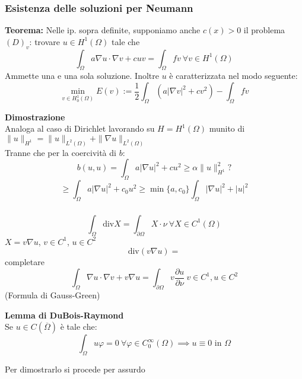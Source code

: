 \subsubsection{Esistenza delle soluzioni per Neumann}
\begin{tcolorbox}
	\textbf{Teorema: }Nelle ip. sopra definite, supponiamo anche $c(x)>0$ il problema $(D)_v$: trovare $u\in H^1(\Omega)$ tale che
	\[\int_{\Omega}^{} a\nabla u\cdot \nabla v+cuv=\int_{\Omega}^{} fv\ \forall v\in H^1(\Omega)\]
	Ammette una e una sola soluzione. Inoltre $u$ è caratterizzata nel modo seguente:
	\[\min_{v\in H_0^1(\Omega)}E(v):=\frac{1}{2}\int_{\Omega}^{} (a|\nabla v|^2+cv^2)-\int_{\Omega}^{} fv\]

\end{tcolorbox}
\textbf{Dimostrazione} 
\\Analoga al caso di Dirichlet lavorando su $H=H^1(\Omega)$ munito di $\|u\|_{H^1}=\|u\|_{L^{2}(\Omega)}+\|\nabla u\|_{L^{2}(\Omega)}$
\\Tranne che per la coercività di $b$:
\[b(u,u)=\int_{\Omega}^{} a|\nabla u|^2+cu^2\ge \alpha\|u\|_{H^1}^2?\]
\[\ge \int_{\Omega}^{} a|\nabla u|^2+c_0u^2\ge \min \{a,c_0\} \int_{\Omega}^{} |\nabla u|^2+|u|^2\]
\subsubsection{}
\[\int_{\Omega}^{} \text{div}X=\int_{\partial \Omega}^{} X\cdot \nu \ \forall X\in C^1(\Omega)\]
$X=v\nabla u$, $v\in C^1$, $u\in C^2$
\[\text{div}(v\nabla u)=\]
completare
\[\int_{\Omega}^{} \nabla u\cdot \nabla v+v\nabla u=\int_{\partial \Omega}^{} v \frac{\partial u}{\partial \nu} \ v\in C^1,u\in C^2\]
(Formula di Gauss-Green)

\begin{tcolorbox}
\textbf{Lemma di DuBois-Raymond}
\\Se $u\in C(\overline{\Omega})$ è tale che:
\[\int_{\Omega}^{} u\varphi=0\ \forall \varphi\in C_0^\infty(\Omega)\implies u\equiv0\text{ in }\Omega\] 
\end{tcolorbox}
Per dimostrarlo si procede per assurdo
